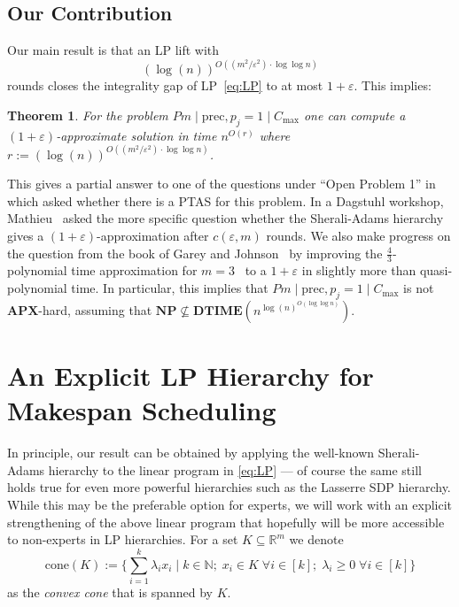 \documentclass[11pt,letterpaper,oneside,english]{article}
\theoremstyle{theorem}
\newtheorem{theorem}{Theorem}
\providecommand{\setN}{\mathbb{N}}
\providecommand{\setR}{\mathbb{R}}
\begin{document}
\subsection{Our Contribution}

Our main result is that an LP lift with 
\[
(\log(n))^{O((m^2/\varepsilon^2) \cdot \log \log n)}
\]
rounds closes the integrality gap of LP~\eqref{eq:LP} to at most $1 + \varepsilon$. This implies:
\begin{theorem}
For the problem $Pm \mid \textrm{prec}, p_j = 1 \mid C_{\max}$ one can compute a $(1 + \varepsilon)$-approximate
solution in time $n^{O(r)}$ where $r := (\log(n))^{O((m^2/\varepsilon^2) \cdot \log \log n)}$. \end{theorem}
This gives a partial answer to one of the questions under ``Open Problem 1'' in \cite{TenOpenProblems-SchuurmanWoeginger1991}
which asked whether there is a PTAS for this problem. 
In a Dagstuhl workshop, Mathieu~\cite{DagstuhlOpenProblems2010} asked the more specific 
question whether the Sherali-Adams hierarchy gives a $(1 + \varepsilon)$-approximation 
after $c(\varepsilon,m)$ rounds. We also make progress on the question from the book of Garey and 
Johnson~\cite{GareyJohnson79}
by improving the $\frac{4}{3}$-polynomial time approximation for $m=3$~\cite{TwoSchedulingAlgorithms-Lam-Sethi-SICOMP77}
to a $1+\varepsilon$ in slightly more than quasi-polynomial time. In particular, this implies that  $Pm \mid \textrm{prec}, p_j = 1 \mid C_{\max}$  is
not $\mathbf{APX}$-hard, assuming that $\mathbf{NP} \not\subseteq \mathbf{DTIME}(n^{\log(n)^{O(\log\log n)}})$.








\section{An Explicit LP Hierarchy for Makespan Scheduling}

In principle, our result can be obtained by applying the well-known Sherali-Adams
hierarchy to the linear program in \eqref{eq:LP} --- of course the same still
holds true for even more powerful hierarchies such as the Lasserre SDP hierarchy. 
While this may be the preferable option for experts, we will work with 
an explicit strengthening of the above linear program that hopefully will be more
accessible to non-experts in LP hierarchies. For a set $K\subseteq \setR^m$ we denote
\[
\textrm{cone}(K) := \Big\{ \sum_{i=1}^k \lambda_ix_i \mid k \in \setN; \; x_i \in K \; \forall i \in [k]; \; \lambda_i \geq 0 \; \forall i \in [k] \Big\}
\] 
as the \emph{convex cone} that is spanned by $K$.
\end{document}

